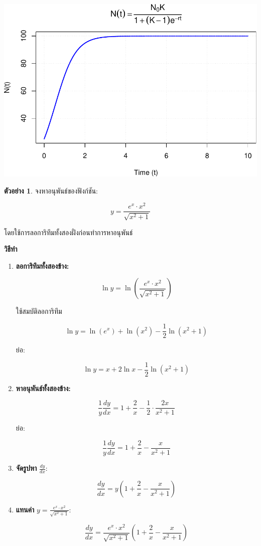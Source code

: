 \documentclass[
]{book}
\theoremstyle{definition}
\theoremstyle{definition}
\newtheorem{example}{ตัวอย่าง}[chapter]
\theoremstyle{definition}
\theoremstyle{definition}
\theoremstyle{remark}
\begin{document}
\includegraphics{SCMA104bookdownproj_files/figure-latex/graph-logistic equation-1.pdf}

\begin{example}
จงหาอนุพันธ์ของฟังก์ชัน:

\[ y = \frac{e^x \cdot x^2}{\sqrt{x^2 + 1}} \]

โดยใช้การลอการิทึมทั้งสองฝั่งก่อนทำการหาอนุพันธ์
\end{example}

\textbf{วิธีทำ}

\begin{enumerate}
\def\labelenumi{\arabic{enumi}.}
\item
  \textbf{ลอการิทึมทั้งสองข้าง:}

  \[ \ln y = \ln\left( \frac{e^x \cdot x^2}{\sqrt{x^2 + 1}} \right) \]

  ใช้สมบัติลอการิทึม

  \[ \ln y = \ln(e^x) + \ln(x^2) - \frac{1}{2} \ln(x^2 + 1) \]

  ย่อ:

  \[ \ln y = x + 2 \ln x - \frac{1}{2} \ln(x^2 + 1) \]
\item
  \textbf{หาอนุพันธ์ทั้งสองข้าง:}

  \[ \frac{1}{y} \frac{dy}{dx} = 1 + \frac{2}{x} - \frac{1}{2} \cdot \frac{2x}{x^2 + 1} \]

  ย่อ:

  \[ \frac{1}{y} \frac{dy}{dx} = 1 + \frac{2}{x} - \frac{x}{x^2 + 1} \]
\item
  \textbf{จัดรูปหา} \(\frac{dy}{dx}\):

  \[ \frac{dy}{dx} = y \left( 1 + \frac{2}{x} - \frac{x}{x^2 + 1} \right) \]
\item
  \textbf{แทนค่า} \(y = \frac{e^x \cdot x^2}{\sqrt{x^2 + 1}}\):

  \[ \frac{dy}{dx} = \frac{e^x \cdot x^2}{\sqrt{x^2 + 1}} \left( 1 + \frac{2}{x} - \frac{x}{x^2 + 1} \right) \]
\end{enumerate}
\end{document}

